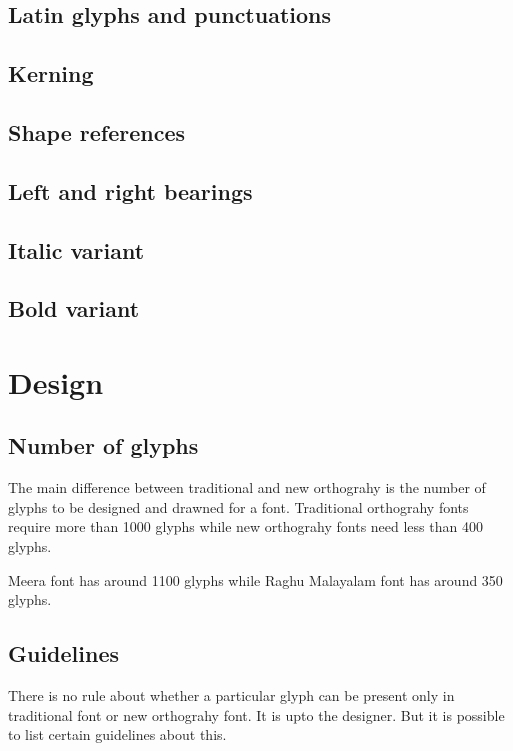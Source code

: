 \subsection {Latin glyphs and punctuations}
\subsection {Kerning}
\subsection {Shape references}
\subsection {Left and right bearings}
\subsection {Italic variant}
\subsection {Bold variant}

\section{Design}
\subsection{Number of glyphs}

The main difference between traditional and new orthograhy is the number of 
glyphs to be designed and drawned for a font.
Traditional orthograhy fonts require more than 1000 glyphs while new orthograhy 
fonts need less than 400 glyphs.

Meera font has around 1100 glyphs while Raghu Malayalam font has around 350 
glyphs.

\subsection{Guidelines}

There is no rule about whether a particular glyph can be present only in
traditional font or new orthograhy font. It is upto the designer. But it is 
possible to list certain guidelines about this.

